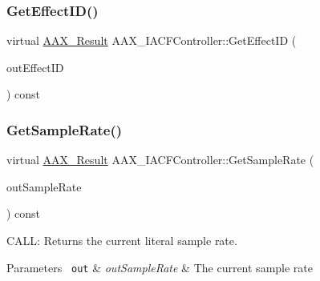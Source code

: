 \subsubsection{\texorpdfstring{GetEffectID()}{GetEffectID()}}
{\footnotesize\ttfamily virtual \mbox{\hyperlink{a00392_a4d8f69a697df7f70c3a8e9b8ee130d2f}{A\+A\+X\+\_\+\+Result}} A\+A\+X\+\_\+\+I\+A\+C\+F\+Controller\+::\+Get\+Effect\+ID (\begin{DoxyParamCaption}\item[{\mbox{\hyperlink{a01873}{A\+A\+X\+\_\+\+I\+String}} $\ast$}]{out\+Effect\+ID }\end{DoxyParamCaption}) const\hspace{0.3cm}{\ttfamily [pure virtual]}}





\mbox{\label{a01637_a434883281a90e7bfa7cfe20d941bfa9a}} 
\subsubsection{\texorpdfstring{GetSampleRate()}{GetSampleRate()}}
{\footnotesize\ttfamily virtual \mbox{\hyperlink{a00392_a4d8f69a697df7f70c3a8e9b8ee130d2f}{A\+A\+X\+\_\+\+Result}} A\+A\+X\+\_\+\+I\+A\+C\+F\+Controller\+::\+Get\+Sample\+Rate (\begin{DoxyParamCaption}\item[{\mbox{\hyperlink{a00392_a3d9eea08f47e0b0a23432e15baa4e885}{A\+A\+X\+\_\+\+C\+Sample\+Rate}} $\ast$}]{out\+Sample\+Rate }\end{DoxyParamCaption}) const\hspace{0.3cm}{\ttfamily [pure virtual]}}



C\+A\+LL\+: Returns the current literal sample rate. 


\begin{DoxyParams}[1]{Parameters}
\mbox{\texttt{ out}}  & {\em out\+Sample\+Rate} & The current sample rate \\
\hline
\end{DoxyParams}
\mbox{\label{a01637_ae2bdea915b0d7165afd000deb9d4defc}} 
